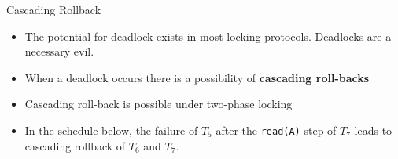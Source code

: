 \documentclass[aspectratio=169, xcolor=dvipsnames]{beamer}
\begin{document}
\begin{frame}{Cascading Rollback}
    \begin{itemize}[<+->]
        \item The potential for deadlock exists in most locking protocols. Deadlocks are a necessary evil.
        \item When a deadlock occurs there is a possibility of \textbf{cascading roll-backs}
        \item Cascading roll-back is possible under two-phase locking
        \item In the schedule below, the failure of $T_5$ after the \texttt{read(A)} step of $T_7$ leads to cascading rollback of $T_6$ and $T_7$.
    \end{itemize}
\end{frame}
\end{document}
